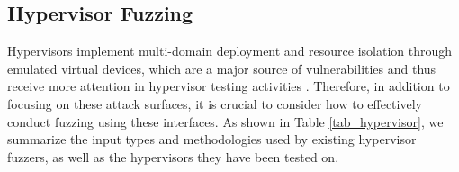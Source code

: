 
\subsection{Hypervisor Fuzzing}
Hypervisors implement multi-domain deployment and resource isolation through emulated virtual devices, which are a major source of vulnerabilities \cite{CVE-2014-2894,CVE-2015-3456,CVE-2015-5279,CVE-2015-6855} and thus receive more attention in hypervisor testing activities \cite{QTest,Cong2013SymbolicEO}.  Therefore, in addition to focusing on these attack surfaces, it is crucial to consider how to effectively conduct fuzzing using these interfaces. As shown in Table \ref{tab_hypervisor}, we summarize the input types and methodologies used by existing hypervisor fuzzers, as well as the hypervisors they have been tested on.

    
    
    


